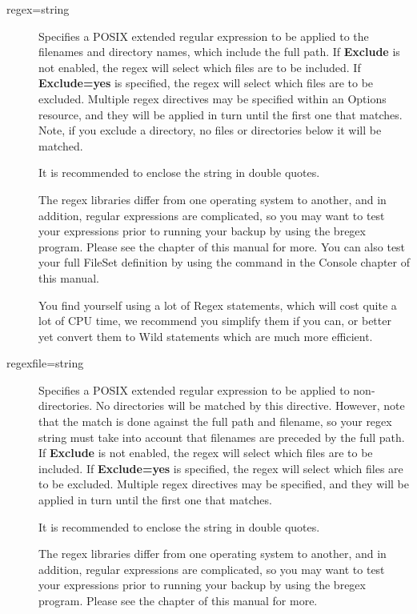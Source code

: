\begin{description}
\item [regex=\lt{}string\gt{}]
   Specifies a POSIX extended regular expression to be applied to the
   filenames and directory names, which include the full path.  If {\bf
   Exclude} is not enabled, the regex will select which files are to be
   included.  If {\bf Exclude=yes} is specified, the regex will select
   which files are to be excluded.  Multiple regex directives may be
   specified within an Options resource, and they will be applied in turn
   until the first one that matches.  Note, if you exclude a directory, no
   files or directories below it will be matched.

   It is recommended to enclose the string in double quotes.

   The regex libraries differ from one operating system to
   another, and in addition, regular expressions are complicated,
   so you may want to test your expressions prior to running your
   backup by using the bregex program. Please see the
    chapter of this manual for
   more. You can also test your full FileSet definition by using
   the  command in the Console        
   chapter of this manual.

   You find yourself using a lot of Regex statements, which will cost quite a lot
   of CPU time, we recommend you simplify them if you can, or better yet
   convert them to Wild statements which are much more efficient.


\item [regexfile=\lt{}string\gt{}]
   Specifies a POSIX extended regular expression to be applied to
   non-directories. No directories will be matched by this directive.  
   However, note that the match is done against the full path and
   filename, so your regex string must take into account that filenames
   are preceded by the full path.
   If {\bf Exclude} is not enabled, the regex will select which files are
   to be included.  If {\bf Exclude=yes} is specified, the regex will
   select which files are to be excluded.  Multiple regex directives may be
   specified, and they will be applied in turn until the first one that
   matches.

   It is recommended to enclose the string in double quotes.

   The regex libraries differ from one operating system to
   another, and in addition, regular expressions are complicated,
   so you may want to test your expressions prior to running your
   backup by using the bregex program. Please see the
    chapter of this manual for
   more.



\end{description}
